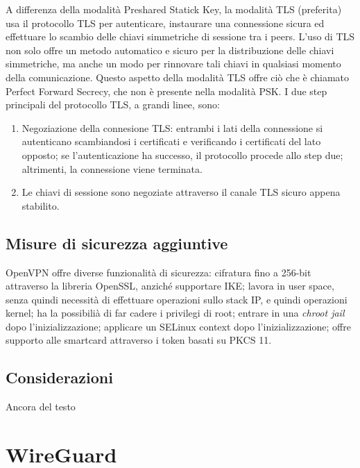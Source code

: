 A differenza della modalità Preshared Statick Key, la modalità TLS (preferita) usa il protocollo TLS per autenticare, instaurare una connessione sicura ed effettuare lo scambio delle chiavi simmetriche di sessione tra i peers. L'uso di TLS non solo offre un metodo automatico e sicuro per la distribuzione delle chiavi simmetriche, ma anche un modo per rinnovare tali chiavi in qualsiasi momento della comunicazione.
Questo aspetto della modalità TLS offre ciò che è chiamato Perfect Forward Secrecy, che non è presente nella modalità PSK.
I due step principali del protocollo TLS, a grandi linee, sono:

\begin{enumerate}
    \item Negoziazione della connesione TLS: entrambi i lati della connessione si autenticano scambiandosi i certificati e verificando i certificati del lato opposto; se l'autenticazione ha successo, il protocollo procede allo step due; altrimenti, la connessione viene terminata.
    \item Le chiavi di sessione sono negoziate attraverso il canale TLS sicuro appena stabilito.
\end{enumerate}


\subsection{Misure di sicurezza aggiuntive}
OpenVPN offre diverse funzionalità di sicurezza: cifratura fino a 256-bit attraverso la libreria OpenSSL, anziché supportare IKE; lavora in user space, senza quindi necessità di effettuare operazioni sullo stack IP, e quindi operazioni kernel; ha la possibilià di far cadere i privilegi di root; entrare in una \emph{chroot jail} dopo l'inizializzazione; applicare un SELinux context dopo l'inizializzazione; offre supporto alle smartcard attraverso i token basati su PKCS 11.

\subsection{Considerazioni}
Ancora del testo

\section{WireGuard}
